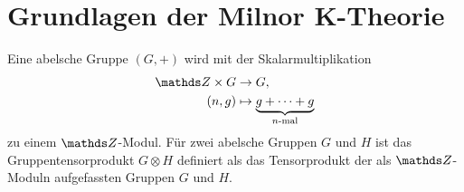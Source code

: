 \documentclass[ngerman,fontsize=11pt, paper=a4, parskip=half, titlepage=true, toc=bib]{scrartcl}
\begin{document}
\maketitle
\tableofcontents


\section{Grundlagen der Milnor K-Theorie}

\begin{Bem}[Gruppentensorprodukt]\label{gruppentensorprodukt}
  Eine abelsche Gruppe $(G,+)$ wird mit der Skalarmultiplikation
  \begin{align*}
    \Z \times G &\to G,\\
    (n,g)&\mapsto \underbrace{g+\dotsb+g}_{\scriptsize\text{$n$-mal}}
  \end{align*}
  zu einem $\Z$-Modul.
  Für zwei abelsche Gruppen $G$ und $H$ ist das 
  Gruppentensorprodukt $G\otimes H$
  definiert als das Tensorprodukt der als $\Z$-Moduln
  aufgefassten Gruppen $G$ und $H$.
  



\end{Bem}
\end{document}
